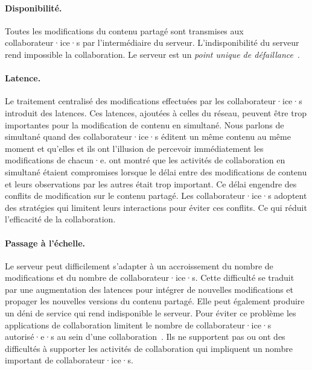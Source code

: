 \paragraph{Disponibilité.}
Toutes les modifications du contenu partagé sont transmises aux collaborateur·ice·s par l'intermédiaire du serveur.
L'indisponibilité du serveur rend impossible la collaboration.
Le serveur est un \emph{point unique de défaillance}~\autocite{dooley2001designing}.

\paragraph{Latence.}
Le traitement centralisé des modifications effectuées par les collaborateur·ice·s introduit des latences.
Ces latences, ajoutées à celles du réseau, peuvent être trop importantes pour la modification de contenu en simultané.
Nous parlons de simultané quand des collaborateur·ice·s éditent un même contenu au même moment et qu'elles et ils ont l'illusion de percevoir immédiatement les modifications de chacun·e.
\textcite{ignat_2015_user-and-delay} ont montré que les activités de collaboration en simultané étaient compromises lorsque le délai entre des modifications de contenu et leurs observations par les autres était trop important.
Ce délai engendre des conflits de modification sur le contenu partagé.
Les collaborateur·ice·s adoptent des stratégies qui limitent leurs interactions pour éviter ces conflits.
Ce qui réduit l'efficacité de la collaboration.

\paragraph{Passage à l'échelle.}
Le serveur peut difficilement s'adapter à un accroissement du nombre de modifications et du nombre de collaborateur·ice·s.
Cette difficulté se traduit par une augmentation des latences pour intégrer de nouvelles modifications et propager les nouvelles versions du contenu partagé.
Elle peut également produire un déni de service qui rend indisponible le serveur.
Pour éviter ce problème les applications de collaboration limitent le nombre de collaborateur·ice·s autorisé·e·s au sein d'une collaboration~\autocite{ignat_2015_user-and-delay,ignat2014_delayeffect}.
Ils ne supportent pas ou ont des difficultés à supporter les activités de collaboration qui impliquent un nombre important de collaborateur·ice·s.

